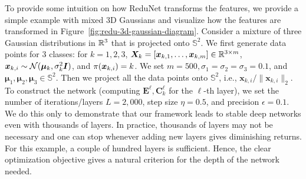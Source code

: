 \documentclass[../../book-main.tex]{subfiles}
\begin{document}
\begin{example}
To provide some intuition on how ReduNet transforms the features, we provide a simple example with mixed 3D Gaussians and visualize how the features are transformed in Figure~\ref{fig:redu-3d-gaussian-diagram}. 
Consider a mixture of three Gaussian distributions in $\mathbb{R}^{3}$ that is projected onto $\mathbb{S}^2$. We first generate data points for 3 classes: for $k=1,2,3$, $\bm{X}_{k}=[\bm{x}_{k,1}, \ldots, \bm{x}_{k,m}] \in \mathbb{R}^{3\times m}$, $\bm{x}_{k,i} \sim \mathcal{N}(\bm{\mu}_{k}, \sigma_{k}^{2} \bm{I})$, and ${\pi}(\bm{x}_{k,i}) = k$.
We set $m=500, \sigma_{1}=\sigma_{2}=\sigma_{3}=0.1$, and $\bm{\mu}_{1}, \bm{\mu}_{2}, \bm{\mu}_{3} \in \mathbb{S}^2$. 
Then we project all the data points onto $\mathbb{S}^{2}$, i.e., $\bm{x}_{k,i}/\|\bm{x}_{k,i}\|_{2}$. 
To construct the network (computing $\bm{E}^{\ell}, \bm{C}^{\ell}_{k}$ for the $\ell$-th layer), we set the number of iterations/layers $L=2,000$, step size $\eta=0.5$, and precision $\epsilon=0.1$. 
We do this only to demonstrate that our framework leads to stable deep networks even with thousands of layers. 
In practice, thousands of layers may not be necessary and one can stop whenever adding new layers gives diminishing returns. 
For this example, a couple of hundred layers is sufficient. Hence, the clear optimization objective gives a natural criterion for the depth of the network needed.


\end{example}
\end{document}
